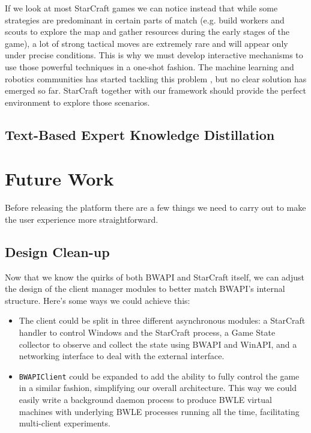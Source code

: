 If we look at most StarCraft games we can notice instead that while some
strategies are predominant in certain parts of match (e.g. build workers and
scouts to explore the map and gather resources during the early stages of the
game), a lot of strong tactical moves are extremely rare and will appear only
under precise conditions. This is why we must develop interactive mechanisms to
use those powerful techniques in a one-shot fashion. The machine learning and
robotics communities has started tackling this problem
\citep{deisenroth2015gaussian, assael2015data, kingma2014semi,
  rasmus2014denoising}, but no clear solution has emerged so far. StarCraft
together with our framework should provide the perfect environment to explore
those scenarios.

\subsection{Text-Based Expert Knowledge Distillation}

\section{Future Work}

Before releasing the platform there are a few things we need to carry out to
make the user experience more straightforward.

\subsection{Design Clean-up}

Now that we know the quirks of both BWAPI and StarCraft itself, we can adjust
the design of the client manager modules to better match BWAPI's internal
structure. Here's some ways we could achieve this:

\begin{itemize}
\item The client could be split in three different asynchronous modules: a
  StarCraft handler to control Windows and the StarCraft process, a Game State
  collector to observe and collect the state using BWAPI and WinAPI, and a
  networking interface to deal with the external interface.
\item \texttt{BWAPIClient} could be expanded to add the ability to fully control
  the game in a similar fashion, simplifying our overall architecture. This way
  we could easily write a background daemon process to produce BWLE virtual
  machines with underlying BWLE processes running all the time, facilitating
  multi-client experiments.
\end{itemize}

